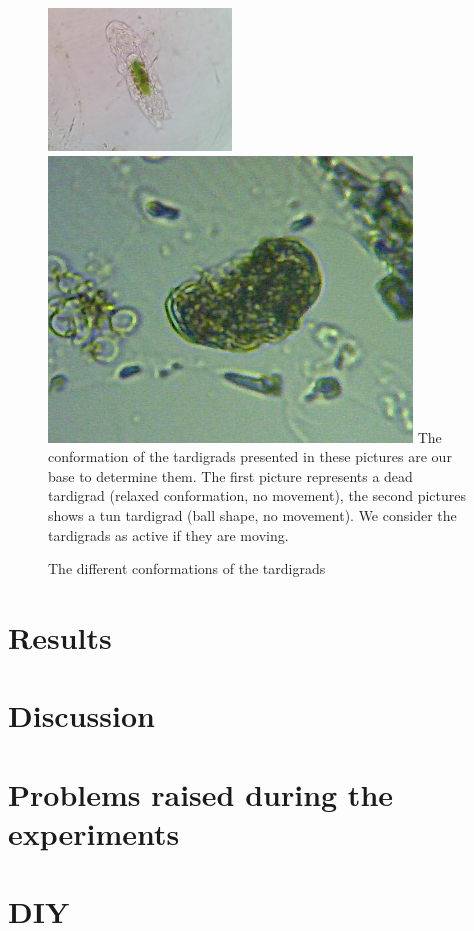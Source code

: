 \documentclass[12pt,a4paper, twocolumn]{article}
\begin{document}
\begin{figure}
\includegraphics[width=0.49\linewidth]{dead.png}
\includegraphics[width=0.49\linewidth]{tun.png}
The conformation of the tardigrads presented in these pictures are our base to determine them. The first picture represents a dead tardigrad (relaxed conformation, no movement), the second pictures shows a tun tardigrad (ball shape, no movement). We consider the tardigrads as active if they are moving.
\label{dead-tun}
\caption{The different conformations of the tardigrads}
\end{figure}


\section{Results}
\lipsum[20]
\section{Discussion}
\lipsum[20]

\newpage
\section*{Problems raised during the experiments}
\lipsum[20]

\section*{DIY}
\lipsum[20]






\end{document}
